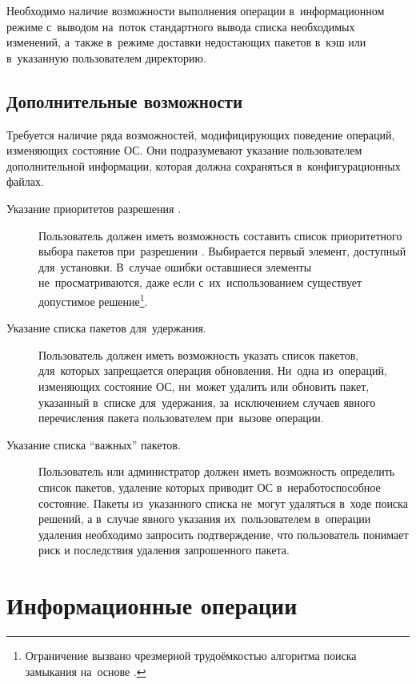 Необходимо наличие возможности выполнения операции в~информационном режиме с~выводом на~поток  стандартного вывода списка необходимых изменений,
а~также в~режиме доставки недостающих пакетов в~кэш или в~указанную пользователем директорию.

\subsection{Дополнительные возможности}
\label{advfeatures}

Требуется наличие ряда возможностей, модифицирующих поведение операций, изменяющих состояние ОС.
Они подразумевают указание пользователем дополнительной информации,
которая должна сохраняться в~конфигурационных файлах. 

\begin{description}

\item[Указание приоритетов разрешения .]
Пользователь должен иметь возможность составить список приоритетного выбора пакетов при~разрешении .
Выбирается первый элемент, доступный для~установки.
В~случае ошибки оставшиеся элементы не~просматриваются,
даже если с~их~использованием существует допустимое решение\footnote{
Ограничение вызвано чрезмерной трудоёмкостью алгоритма поиска замыкания на~основе .
}.

\item[Указание списка пакетов для~удержания.]
Пользователь должен иметь возможность указать список пакетов, для~которых запрещается операция обновления.
Ни~одна из~операций, изменяющих состояние ОС, ни~может удалить или обновить пакет, указанный в~списке для~удержания,
за~исключением случаев явного перечисления пакета пользователем при~вызове операции.

\item[Указание списка ``важных'' пакетов.]
Пользователь или администратор должен иметь возможность определить список пакетов, 
удаление которых приводит ОС в~неработоспособное состояние.
Пакеты из~указанного списка не~могут удаляться в~ходе поиска решений, а в~случае явного указания их~пользователем в~операции удаления
необходимо запросить подтверждение, что пользователь понимает риск и последствия удаления запрошенного пакета.

\end{description}

\section{Информационные операции}

